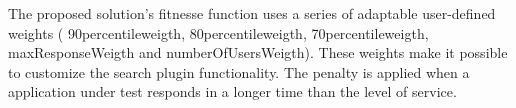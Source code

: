 The proposed solution's fitnesse function uses a series of adaptable user-defined weights ( 90percentileweigth, 80percentileweigth,  70percentileweigth, maxResponseWeigth and numberOfUsersWeigth). These weights make it possible to customize the search plugin functionality. The penalty is applied when a application under test responds in a longer time than the level of service.



